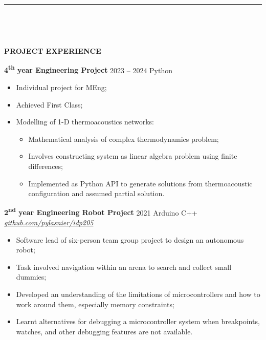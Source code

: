 \documentclass[
  11pt,
  a4paper,
]{article}
\providecommand{\tightlist}{%
  \setlength{\itemsep}{0pt}\setlength{\parskip}{0pt}}
\newcommand{\itemspace}{0.8ex}
\newcommand{\ruledheader}[2]{%
\begingroup
\setlength{\fboxsep}{0pt}%
\colorbox{#1}{%
\parbox[b][1.2ex][t]{35mm}{\begin{tiny}\ \end{tiny}}}%
\parbox[b][1.2ex][t]{5mm}{\begin{tiny}\ \end{tiny}}%
\uppercase{\textbf{#2}}
\endgroup}
\begin{document}
\begin{Large}

\vspace{-1.5ex}\rule{\textwidth}{0.8pt}\vspace{2ex}

\ruledheader{cyan!50!teal}{Project experience}\end{Large}

\vspace{\itemspace}

\textbf{4\textsuperscript{th} year Engineering Project} \textbar{} 2023
– 2024 \textbar{} Python

\begin{itemize}
\tightlist
\item
  Individual project for MEng;
\item
  Achieved First Class;
\item
  Modelling of 1-D thermoacoustics networks:

  \begin{itemize}
  \tightlist
  \item
    Mathematical analysis of complex thermodynamics problem;
  \item
    Involves constructing system as linear algebra problem using finite
    differences;
  \item
    Implemented as Python API to generate solutions from thermoacoustic
    configuration and assumed partial solution.
  \end{itemize}
\end{itemize}

\vspace{\itemspace}

\textbf{2\textsuperscript{nd} year Engineering Robot Project} \textbar{}
2021 \textbar{} Arduino C++ \textbar{}
\href{https://github.com/pylasnier/idp205}{\emph{github.com/pylasnier/idp205}}

\begin{itemize}
\tightlist
\item
  Software lead of six-person team group project to design an autonomous
  robot;
\item
  Task involved navigation within an arena to search and collect small
  dummies;
\item
  Developed an understanding of the limitations of microcontrollers and
  how to work around them, especially memory constraints;
\item
  Learnt alternatives for debugging a microcontroller system when
  breakpoints, watches, and other debugging features are not available.
\end{itemize}
\end{document}

